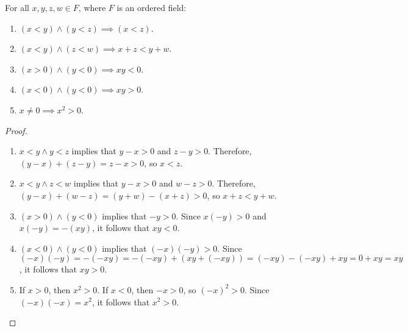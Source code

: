 \documentclass[12pt]{article}
\begin{document}
\begin{thm} For all $x, y, z, w \in F$, where $F$ is an ordered field:
    \begin{enumerate}
        \item $(x < y) \land (y < z) \implies (x < z)$.
        \item $(x < y) \land (z < w) \implies x + z < y + w$.
        \item $(x > 0) \land (y < 0) \implies xy < 0$.
        \item $(x < 0) \land (y < 0) \implies xy > 0$.
        \item $x \neq 0 \implies x^2 > 0$.
    \end{enumerate}
\end{thm}

\begin{proof}\proofbreak
    \begin{enumerate}
        \item $x < y \land y < z$ implies that $y - x > 0$ and $z - y > 0$. Therefore, $(y - x) + (z - y) = z - x > 0$, so $x < z$.
        \item $x < y \land z < w$ implies that $y - x > 0$ and $w - z > 0$. Therefore, $(y - x) + (w - z) = (y + w) - (x + z) > 0$, so $x + z < y + w$.
        \item $(x > 0) \land (y < 0)$ implies that $-y > 0$. Since $x(-y) > 0$ and $x(-y) = -(xy)$, it follows that $xy < 0$.
        \item $(x < 0) \land (y < 0)$ implies that $(-x)(-y) > 0$. Since $(-x)(-y) = -(-xy) = -(-xy) + (xy  + (-xy)) = (-xy) - (-xy) + xy = 0 + xy = xy$, it follows that $xy > 0$.
        \item If $x > 0$, then $x^2 > 0$. If $x < 0$, then $-x > 0$, so $(-x)^2 > 0$. Since $(-x)(-x) = x^2$, it follows that $x^2 > 0$.
    \end{enumerate}
\end{proof}
\end{document}

